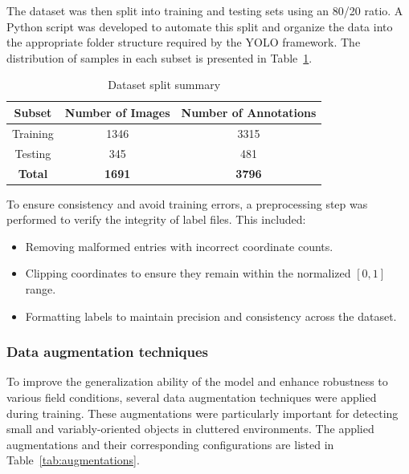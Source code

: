 The dataset was then split into training and testing sets using an 80/20 ratio. A Python script was developed to automate this split and organize the data into the appropriate folder structure required by the YOLO framework. The distribution of samples in each subset is presented in Table~\ref{tab:split}.

\begin{table}[h]
\centering
\caption{Dataset split summary}
\begin{tabular}{|c|c|c|}
\hline
\textbf{Subset} & \textbf{Number of Images} & \textbf{Number of Annotations} \\
\hline
Training & 1346 & 3315 \\
Testing & 345 & 481 \\
\hline
\textbf{Total} & \textbf{1691} & \textbf{3796} \\
\hline
\end{tabular}
\label{tab:split}
\end{table}



To ensure consistency and avoid training errors, a preprocessing step was performed to verify the integrity of label files. This included:
\begin{itemize}
    \item Removing malformed entries with incorrect coordinate counts.
    \item Clipping coordinates to ensure they remain within the normalized \([0,1]\) range.
    \item Formatting labels to maintain precision and consistency across the dataset.
\end{itemize}

\subsubsection{Data augmentation techniques}

To improve the generalization ability of the model and enhance robustness to various field conditions, several data augmentation techniques were applied during training. These augmentations were particularly important for detecting small and variably-oriented objects in cluttered environments. The applied augmentations and their corresponding configurations are listed in Table~\ref{tab:augmentations}.

